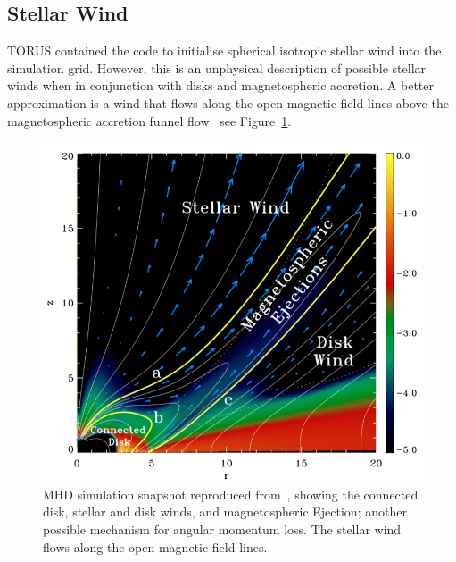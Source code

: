 \documentclass[fleqn,usenatbib]{mnras}
\begin{document}
\subsection{Stellar Wind}
\label{sec:wind}
TORUS contained the code to initialise spherical isotropic stellar wind into the simulation grid. However, this is an unphysical description of possible stellar winds when in conjunction with disks and magnetospheric accretion. A better approximation is a wind that flows along the open magnetic field lines above the magnetospheric accretion funnel flow~\citep[e.g.][]{2009A&A...508.1117Z,2012MNRAS.426.2901K} see Figure~\ref{fig:zanni}.
\begin{figure}
    \centering
    \includegraphics[width=\linewidth]{figures/zanni}
    \caption{MHD simulation snapshot reproduced from~\citet{2009A&A...508.1117Z}, showing the connected disk, stellar and disk winds, and magnetospheric Ejection; another possible mechanism for angular momentum loss. The stellar wind flows along the open magnetic field lines.}
    \label{fig:zanni}
\end{figure}
\end{document}
